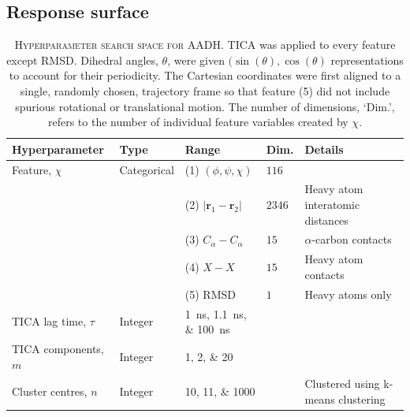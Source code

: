 \subsection{Response surface}\label{sec:aadh_rsm}

\begin{table}[ht]
    \caption[Hyperparameter search space for AADH]{\textsc{Hyperparameter search space for AADH}. TICA was applied to every feature except RMSD. Dihedral angles, $\theta$, were given $(\sin(\theta),\cos(\theta)$ representations to account for their periodicity.  The Cartesian coordinates were first aligned to a single, randomly chosen, trajectory frame so that feature (5) did not include spurious rotational or translational motion. The number of dimensions, `Dim.', refers to the number of individual feature variables created by $\chi$.}
    \centering
    \begin{tabularx}{0.9\textwidth}{ >{\raggedright\arraybackslash}ll>{\raggedright\arraybackslash}Xl >{\raggedright\arraybackslash}X } 
    \toprule
    Hyperparameter & Type & Range & Dim. & Details \\
     \midrule
    Feature, $\chi$ & Categorical & (1) $(\phi, \psi, \chi)$ & $\num{116}$  & \\
    & & (2) $|\mathbf{r}_{1}-\mathbf{r}_{2}|$  & $\num{ 2346}$& Heavy atom interatomic distances \\
    & & (3) $C_{\alpha}-C_{\alpha}$ & $\num{15}$ & $\alpha$-carbon contacts\\ 
    & & (4) $X-X$  & $\num{15}$ & Heavy atom contacts\\ 
    & & (5) RMSD & $\num{1}$ &  Heavy atoms only\\ 
    \midrule
    TICA lag time, $\tau$ & Integer &\SIlist[list-final-separator = { ... }]{1;1.1;100}{ns} &  & \\
    \midrule
    TICA components, $m$& Integer &\numlist[list-final-separator = { ... }]{1;2;20} & & \\
    \midrule
    Cluster centres, $n$ & Integer & \numlist[list-final-separator = { ... }]{10;11;1000}& &  Clustered using k-means clustering  \\
    
     \bottomrule
    \end{tabularx}
    \label{tab:aadh_searchspace}
\end{table}

